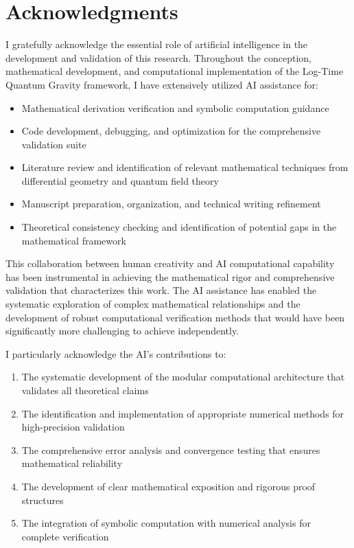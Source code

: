 \section*{Acknowledgments}

I gratefully acknowledge the essential role of artificial intelligence in the development and validation of this research. Throughout the conception, mathematical development, and computational implementation of the Log-Time Quantum Gravity framework, I have extensively utilized AI assistance for:

\begin{itemize}
\item Mathematical derivation verification and symbolic computation guidance
\item Code development, debugging, and optimization for the comprehensive validation suite
\item Literature review and identification of relevant mathematical techniques from differential geometry and quantum field theory
\item Manuscript preparation, organization, and technical writing refinement
\item Theoretical consistency checking and identification of potential gaps in the mathematical framework
\end{itemize}

This collaboration between human creativity and AI computational capability has been instrumental in achieving the mathematical rigor and comprehensive validation that characterizes this work. The AI assistance has enabled the systematic exploration of complex mathematical relationships and the development of robust computational verification methods that would have been significantly more challenging to achieve independently.

I particularly acknowledge the AI's contributions to:
\begin{enumerate}
\item The systematic development of the modular computational architecture that validates all theoretical claims
\item The identification and implementation of appropriate numerical methods for high-precision validation
\item The comprehensive error analysis and convergence testing that ensures mathematical reliability
\item The development of clear mathematical exposition and rigorous proof structures
\item The integration of symbolic computation with numerical analysis for complete verification
\end{enumerate}

